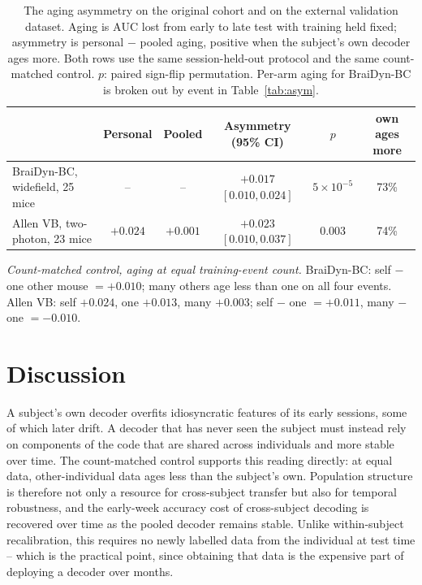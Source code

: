 \documentclass{article}
\newcommand{\auc}{\mathrm{AUC}}
\begin{document}
\begin{table}[t]\centering
\caption{The aging asymmetry on the original cohort and on the external validation dataset. Aging
is $\auc$ lost from early to late test with training held fixed; asymmetry is personal $-$ pooled
aging, positive when the subject's own decoder ages more. Both rows use the same session-held-out
protocol and the same count-matched control. $p$: paired sign-flip permutation. Per-arm aging for BraiDyn-BC is broken out by event in Table~\ref{tab:asym}.}
\label{tab:allen}
\setlength{\tabcolsep}{3pt}
{\small
\begin{tabular}{lccccc}
\toprule
& Personal & Pooled & Asymmetry (95\% CI) & $p$ & own ages more \\
\midrule
BraiDyn-BC, widefield, 25 mice & -- & -- & $+0.017$ $[0.010, 0.024]$ & $5\times10^{-5}$ & 73\% \\
Allen VB, two-photon, 23 mice & $+0.024$ & $+0.001$ & $+0.023$ $[0.010, 0.037]$ & 0.003 & 74\% \\
\bottomrule
\end{tabular}}

\vspace{3pt}
\begin{minipage}{0.95\linewidth}\small\raggedright
\emph{Count-matched control, aging at equal training-event count.} BraiDyn-BC: self $-$ one other
mouse $= +0.010$; many others age less than one on all four events. Allen VB: self $+0.024$, one
$+0.013$, many $+0.003$; self $-$ one $= +0.011$, many $-$ one $= -0.010$.
\end{minipage}
\end{table}

\section{Discussion}
A subject's own decoder overfits idiosyncratic features of its early sessions, some of which later
drift. A decoder that has never seen the subject must instead rely on components of the code that are
shared across individuals and more stable over time. The count-matched control supports this reading
directly: at equal data, other-individual data ages less than the subject's own. Population structure
is therefore not only a resource for cross-subject transfer but also for temporal robustness, and the
early-week accuracy cost of cross-subject decoding is recovered over time as the pooled decoder
remains stable. Unlike within-subject recalibration, this requires no newly labelled data from the
individual at test time -- which is the practical point, since obtaining that data is the expensive
part of deploying a decoder over months.
\end{document}

